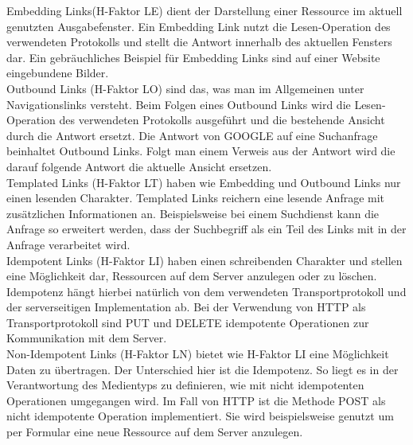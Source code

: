 Embedding Links(H-Faktor LE) dient der Darstellung einer Ressource im aktuell genutzten Ausgabefenster. Ein Embedding Link nutzt die Lesen-Operation des verwendeten Protokolls und stellt die Antwort innerhalb des aktuellen Fensters dar. Ein gebräuchliches Beispiel für Embedding Links sind auf einer Website eingebundene Bilder.\\
Outbound Links (H-Faktor LO) sind das, was man im Allgemeinen unter Navigationslinks versteht. Beim Folgen eines Outbound Links wird die Lesen-Operation des verwendeten Protokolls ausgeführt und die bestehende Ansicht durch die Antwort ersetzt. Die Antwort von GOOGLE auf eine Suchanfrage beinhaltet Outbound Links. Folgt man einem Verweis aus der Antwort wird die darauf folgende Antwort die aktuelle Ansicht ersetzen.\\
Templated Links (H-Faktor LT) haben wie Embedding und Outbound Links nur einen lesenden Charakter. Templated Links reichern eine lesende Anfrage mit zusätzlichen Informationen an. Beispielsweise bei einem Suchdienst kann die Anfrage so erweitert werden, dass der Suchbegriff als ein Teil des Links mit in der Anfrage verarbeitet wird.\\
Idempotent Links (H-Faktor LI) haben einen schreibenden Charakter und stellen eine Möglichkeit dar, Ressourcen auf dem Server anzulegen oder zu löschen. Idempotenz hängt hierbei natürlich von dem verwendeten Transportprotokoll und der serverseitigen Implementation ab. Bei der Verwendung von HTTP als Transportprotokoll sind PUT und DELETE idempotente Operationen zur Kommunikation mit dem Server.\\
Non-Idempotent Links (H-Faktor LN) bietet wie H-Faktor LI eine Möglichkeit Daten zu übertragen. Der Unterschied hier ist die Idempotenz. So liegt es in der Verantwortung des Medientyps zu definieren, wie mit nicht idempotenten Operationen umgegangen wird. Im Fall von HTTP ist die Methode POST als nicht idempotente Operation implementiert. Sie wird beispielsweise genutzt um per Formular eine neue Ressource auf dem Server anzulegen.\\

